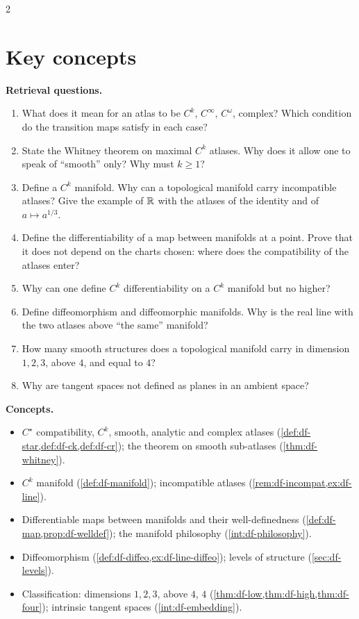 \begin{paracol}{2}
\section*{Key concepts}
\begin{keyconcepts}
\textbf{Retrieval questions.}
\begin{enumerate}
  \item What does it mean for an atlas to be $C^k$, $C^\infty$, $C^\omega$, complex? Which condition do the transition maps satisfy in each case?
  \item State the Whitney theorem on maximal $C^k$ atlases. Why does it allow one to speak of ``smooth'' only? Why must $k\ge1$?
  \item Define a $C^k$ manifold. Why can a topological manifold carry incompatible atlases? Give the example of $\mathbb{R}$ with the atlases of the identity and of $a\mapsto a^{1/3}$.
  \item Define the differentiability of a map between manifolds at a point. Prove that it does not depend on the charts chosen: where does the compatibility of the atlases enter?
  \item Why can one define $C^k$ differentiability on a $C^k$ manifold but no higher?
  \item Define diffeomorphism and diffeomorphic manifolds. Why is the real line with the two atlases above ``the same'' manifold?
  \item How many smooth structures does a topological manifold carry in dimension $1,2,3$, above $4$, and equal to $4$?
  \item Why are tangent spaces not defined as planes in an ambient space?
\end{enumerate}
\textbf{Concepts.}
\begin{itemize}
  \item $C^\star$ compatibility, $C^k$, smooth, analytic and complex atlases (\cref{def:df-star,def:df-ck,def:df-cr}); the theorem on smooth sub-atlases (\cref{thm:df-whitney}).
  \item $C^k$ manifold (\cref{def:df-manifold}); incompatible atlases (\cref{rem:df-incompat,ex:df-line}).
  \item Differentiable maps between manifolds and their well-definedness (\cref{def:df-map,prop:df-welldef}); the manifold philosophy (\cref{int:df-philosophy}).
  \item Diffeomorphism (\cref{def:df-diffeo,ex:df-line-diffeo}); levels of structure (\cref{sec:df-levels}).
  \item Classification: dimensions $1,2,3$, above $4$, $4$ (\cref{thm:df-low,thm:df-high,thm:df-four}); intrinsic tangent spaces (\cref{int:df-embedding}).
\end{itemize}
\end{keyconcepts}

\flushside
\end{paracol}

